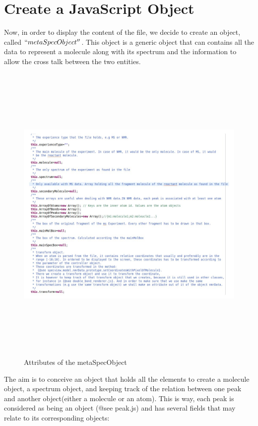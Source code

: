 \section{Create a JavaScript Object}
Now, in order to display the content of the file, we decide to create an object, called $``metaSpecObject''$. This object is a generic object that can contains all the data to represent a molecule along with its spectrum and the information to allow the cross talk between the two entities.
    \begin{figure}[h]
    \begin{centering}
    \caption{Attributes of the metaSpecObject}
\includegraphics[width=195mm,height=150mm]{./images/metaSpecObjectAttributes}
    \end{centering}
    \end{figure}
\clearpage

The aim is to conceive an object that holds all the elements to create a molecule object, a spectrum object, and keeping track of the relation between one peak and another object(either a molecule or an atom).
This is way, each peak is considered as being an object (@see peak.js) and has several fields that may relate to its corresponding objects:\\

